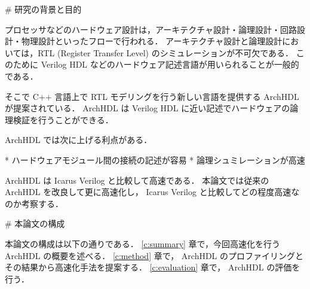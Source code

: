 # 研究の背景と目的

プロセッサなどのハードウェア設計は，アーキテクチャ設計・論理設計・回路設計・物理設計といったフローで行われる．
アーキテクチャ設計と論理設計においては，RTL (Register Transfer Level)
のシミュレーションが不可欠である．
このために Verilog HDL などのハードウェア記述言語が用いられることが一般的である．

そこで C++ 言語上で RTL モデリングを行う新しい言語を提供する ArchHDL が提案されている．
ArchHDL は Verilog HDL に近い記述でハードウェアの論理検証を行うことができる．

ArchHDL では次に上げる利点がある．

* ハードウェアモジュール間の接続の記述が容易
* 論理シュミレーションが高速

ArchHDL は Icarus Verilog と比較して高速である．
本論文では従来の ArchHDL を改良して更に高速化し， Icarus Verilog と比較してどの程度高速なのか考察する．



# 本論文の構成

本論文の構成は以下の通りである． \ref{c:summary} 章で，今回高速化を行う ArchHDL の概要を述べる．
\ref{c:method} 章で， ArchHDL のプロファイリングとその結果から高速化手法を提案する．
\ref{c:evaluation} 章で， ArchHDL の評価を行う．


